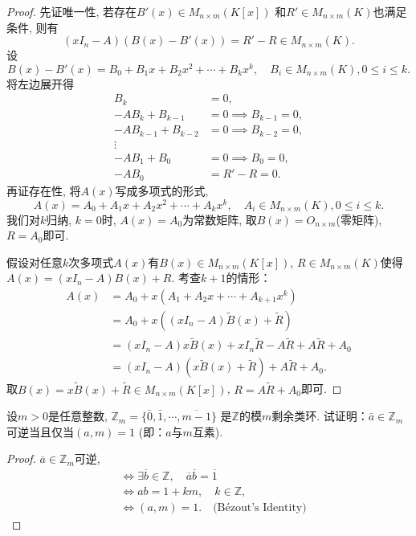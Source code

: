 \begin{proof}
    先证唯一性, 若存在$B'(x) \in M_{n \times m}(K[x])$
和$R' \in M_{n \times m}(K)$也满足条件, 则有
    \[
        (xI_n - A)(B(x) - B'(x)) = R' - R \in M_{n \times m}(K).
    \]
    设
\[
    B(x) - B'(x) = B_0 + B_1x + B_2x^2 + \cdots + B_kx^k, \quad B_i \in M_{n \times m}(K), 0 \leqslant i \leqslant k.
\]
    将左边展开得
\[
\begin{aligned}
    B_k &= 0,\\
    -AB_k + B_{k - 1} &= 0 \implies B_{k - 1} = 0,\\
    -AB_{k - 1} + B_{k - 2} &= 0 \implies B_{k - 2} = 0,\\
    \vdots\\
    -AB_1 + B_0 &= 0 \implies B_0 = 0,\\
    -AB_0 &= R' - R = 0.
\end{aligned}
\]
    再证存在性, 将$A(x)$写成多项式的形式,
\[
    A(x) = A_0 + A_1x + A_2x^2 + \cdots + A_kx^k, \quad A_i \in M_{n \times m}(K), 0 \leqslant i \leqslant k.
\]
我们对$k$归纳, $k = 0$时, $A(x) = A_0$为常数矩阵, 取$B(x) = O_{n \times m}$(零矩阵), 
$R = A_0$即可.

假设对任意$k$次多项式$A(x)$有$B(x) \in M_{n \times m}(K[x])$, $R \in M_{n \times m}(K)$使得
$A(x) = (xI_n - A)B(x) + R$. 考查$k + 1$的情形：
\[
\begin{aligned}
    A(x) &= A_0 + x(A_1 + A_2x + \cdots + A_{k + 1}x^k)\\
    &= A_0 + x((xI_n - A)\tilde{B}(x) + \tilde{R})\\
    &= (xI_n - A)x\tilde{B}(x) + xI_n\tilde{R} - A\tilde{R} + A\tilde{R}+ A_0\\
    &= (xI_n - A)(x\tilde{B}(x) + \tilde{R}) + A\tilde{R} + A_0.
\end{aligned}
\]
取$B(x) = x\tilde{B}(x) + \tilde{R} \in M_{n \times m}(K[x])$, 
$R = A\tilde{R} + A_0$即可.
\end{proof}

\begin{problem}
    设$m > 0$是任意整数, $\mathbb{Z}_m = \{\bar{0}, \bar{1}, \cdots, \overline{m-1}\}$
是$\mathbb{Z}$的模$m$剩余类环. 试证明：$\bar{a} \in \mathbb{Z}_m$可逆当且仅当$(a, m) = 1$
(即：$a$与$m$互素).
\end{problem}

\begin{proof}
    $\overline{a} \in \mathbb{Z}_m$可逆, 
\[
\begin{aligned}
    &\iff \exists \overline{b} \in \mathbb{Z}, \quad \overline{a}\overline{b} = \overline{1}\\
    &\iff ab = 1 + km, \quad k \in \mathbb{Z},\\
    &\iff (a, m) = 1. \quad \text{(Bézout's Identity)}
\end{aligned}
\]
\end{proof}


